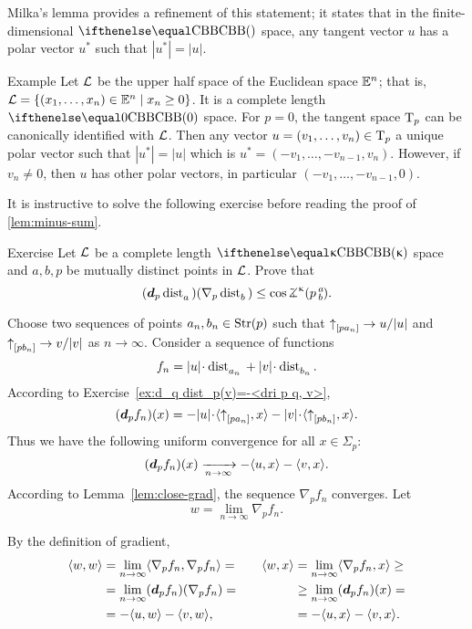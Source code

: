 Milka's lemma provides a refinement of this statement;
it states that in the finite-dimensional $\Alex{}$ space, any tangent vector $u$ has a polar vector $u^*$ such that $|u^*|= |u|$.

\begin{thm}{Example}
Let $\mathcal{L}$ be the upper half space of the Euclidean space $\mathbb{E}^n$;
that is, $\spc{L}=\{(x_1,\ldots, x_n)\in \EE^n\mid x_n\ge 0\}$.
It is a complete length $\Alex{0}$ space.
For $p=0$, the tangent space $\text{\rm T}_p$ can be canonically identified with $\mathcal{L}$.
Then any vector $u=(v_1,\ldots, v_n)\in \T_p$
a unique polar vector such that $|u^*|=|u|$ which is $u^*=(-v_1, \ldots, -v_{n-1}, v_n)$.
However, if $v_n\ne 0$, then $u$ has other polar vectors, in particular $(-v_1, \ldots, -v_{n-1}, 0)$.
\end{thm}

It is instructive to solve the following exercise before reading the proof of \ref{lem:minus-sum}.


\begin{thm}{Exercise}\label{ex:d dist(grad)<0}
Let $\mathcal{L}$ be a complete length $\Alex\kappa$ space and $a,b,p$
be mutually distinct points in $\mathcal{L}$.
Prove that 
\[(\dd_p\distfun{a}{}{})(\nabla_p\distfun{b}{}{})
\le\cos\angk\kappa pab.\]
\end{thm}

Choose two sequences of points $a_n,b_n\in \Str(p)$ such that $\dir{p}{a_n}\to u/|u|$ and $\dir{p}{b_n}\to v/|v|$ as $n\to \infty$.
Consider a sequence of functions 
\[f_n=|u|\cdot\distfun{a_n}{}{}+|v|\cdot\distfun{b_n}{}{}.\]
According to Exercise~\ref{ex:d_q dist_p(v)=-<dri p q, v>}, 
\[(\dd_pf_n)(x)=-|u|\cdot\<\dir{p}{a_n},x\>-|v|\cdot\<\dir{p}{b_n},x\>.\]
Thus we have the following uniform convergence for all $x\in\Sigma_p$:
\[(\dd_pf_n)(x)\xto[n\to\infty]{}-\<u,x\>-\<v,x\>.\]
According to Lemma~\ref{lem:close-grad}, 
the sequence $\nabla_pf_n$ converges.
Let 
\[w=\lim_{n\to\infty}\nabla_pf_n.\]

By the definition of gradient,
\[\begin{aligned}
\<w,w\>&=\lim_{n\to\infty}\<\nabla_pf_n,\nabla_pf_n\>=
&&&%
\<w,x\>&=\lim_{n\to\infty}\<\nabla_pf_n,x\>\ge
\\%
&=\lim_{n\to\infty}(\dd_p f_n)(\nabla_p f_n)
=
&&&%
&\ge
\lim_{n\to\infty}(\dd_pf_n)(x)
=
\\%
&=-\<u,w\>-\<v,w\>,
&&&%
&=-\<u,x\>-\<v,x\>.
\end{aligned}\]
\qedsf












